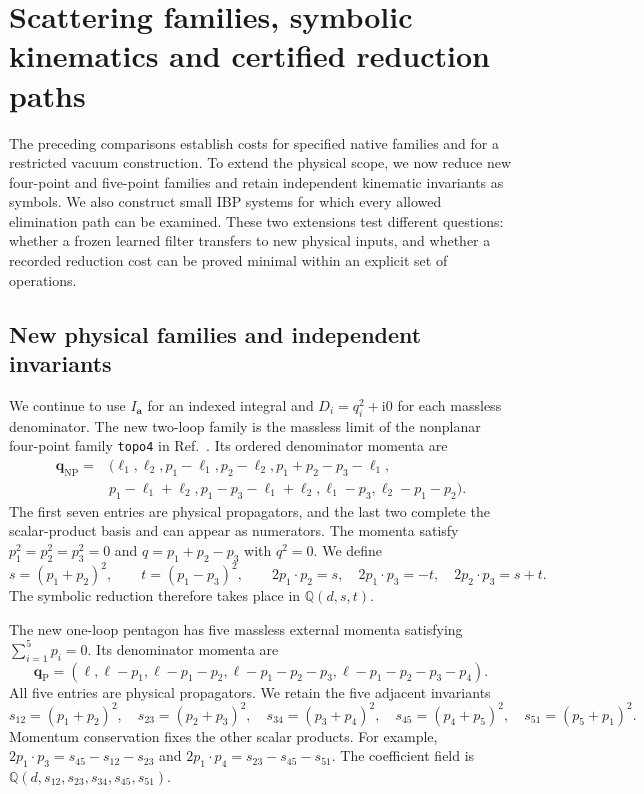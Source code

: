 \clearpage
\section{Scattering families, symbolic kinematics and certified reduction paths}
\label{sec:generalization}
The preceding comparisons establish costs for specified native families and
for a restricted vacuum construction. To extend the physical scope, we now
reduce new four-point and five-point families and retain independent
kinematic invariants as symbols. We also construct small IBP systems for
which every allowed elimination path can be examined. These two extensions
test different questions: whether a frozen learned filter transfers to
new physical inputs, and whether a recorded reduction cost can be proved
minimal within an explicit set of operations.

\subsection{New physical families and independent invariants}
We continue to use $I_{\boldsymbol a}$ for an indexed integral and
$D_i=q_i^2+\mathrm{i}0$ for each massless denominator. The new two-loop
family is the massless limit of the nonplanar four-point family
\texttt{topo4} in Ref.~\cite{KiraOriginal}. Its ordered denominator momenta are
\begin{align}
 \boldsymbol q_{\mathrm{NP}}={}&
 (\ell_1,\ell_2,p_1-\ell_1,p_2-\ell_2,
 p_1+p_2-p_3-\ell_1,\nonumber\\
 &p_1-\ell_1+\ell_2,p_1-p_3-\ell_1+\ell_2,
 \ell_1-p_3,\ell_2-p_1-p_2).
 \label{eq:general-np-momenta}
\end{align}
The first seven entries are physical propagators, and the last two
complete the scalar-product basis and can appear as numerators.
The momenta satisfy $p_1^2=p_2^2=p_3^2=0$ and
$q=p_1+p_2-p_3$ with $q^2=0$. We define
\begin{equation}
 s=(p_1+p_2)^2,\qquad t=(p_1-p_3)^2,
 \qquad
 2p_1\!\cdot p_2=s,\quad
 2p_1\!\cdot p_3=-t,\quad
 2p_2\!\cdot p_3=s+t.
\end{equation}
The symbolic reduction therefore takes place in $\mathbb Q(d,s,t)$.

The new one-loop pentagon has five massless external momenta satisfying
$\sum_{i=1}^{5}p_i=0$. Its denominator momenta are
\begin{equation}
 \boldsymbol q_{\mathrm{P}}=
 (\ell,\ell-p_1,\ell-p_1-p_2,
 \ell-p_1-p_2-p_3,\ell-p_1-p_2-p_3-p_4).
 \label{eq:general-pentagon}
\end{equation}
All five entries are physical propagators. We retain the five adjacent
invariants
\[
 s_{12}=(p_1+p_2)^2,\quad s_{23}=(p_2+p_3)^2,\quad
 s_{34}=(p_3+p_4)^2,\quad s_{45}=(p_4+p_5)^2,\quad
 s_{51}=(p_5+p_1)^2.
\]
Momentum conservation fixes the other scalar products. For example,
$2p_1\cdot p_3=s_{45}-s_{12}-s_{23}$ and
$2p_1\cdot p_4=s_{23}-s_{45}-s_{51}$.
The coefficient field is
$\mathbb Q(d,s_{12},s_{23},s_{34},s_{45},s_{51})$.

